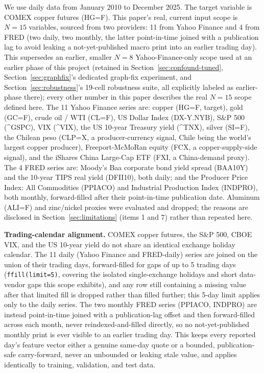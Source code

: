 \documentclass[journal]{IEEEtran}
\begin{document}
We use daily data from January 2010 to December 2025. The target variable is COMEX copper futures (HG=F). This paper's real, current input scope is $N=15$ variables, sourced from two providers: 11 from Yahoo Finance and 4 from FRED (two daily, two monthly, the latter point-in-time joined with a publication lag to avoid leaking a not-yet-published macro print into an earlier trading day). This supersedes an earlier, smaller $N=8$ Yahoo-Finance-only scope used at an earlier phase of this project (retained in Section~\ref{sec:confound-tuned}, Section~\ref{sec:graphfix}'s dedicated graph-fix experiment, and Section~\ref{sec:robustness}'s 19-cell robustness suite, all explicitly labeled as earlier-phase there); every other number in this paper describes the real $N=15$ scope defined here. The 11 Yahoo Finance series are: copper (HG=F, target), gold (GC=F), crude oil / WTI (CL=F), US Dollar Index (DX-Y.NYB), S\&P 500 (\^{}GSPC), VIX (\^{}VIX), the US 10-year Treasury yield (\^{}TNX), silver (SI=F), the Chilean peso (CLP=X, a producer-currency signal, Chile being the world's largest copper producer), Freeport-McMoRan equity (FCX, a copper-supply-side signal), and the iShares China Large-Cap ETF (FXI, a China-demand proxy). The 4 FRED series are: Moody's Baa corporate bond yield spread (BAA10Y) and the 10-year TIPS real yield (DFII10), both daily; and the Producer Price Index: All Commodities (PPIACO) and Industrial Production Index (INDPRO), both monthly, forward-filled after their point-in-time publication date. Aluminum (ALI=F) and zinc/nickel proxies were evaluated and dropped; the reasons are disclosed in Section~\ref{sec:limitations} (items 1 and 7) rather than repeated here.

\textbf{Trading-calendar alignment.} COMEX copper futures, the S\&P 500, CBOE VIX, and the US 10-year yield do not share an identical exchange holiday calendar. The 11 daily (Yahoo Finance and FRED-daily) series are joined on the union of their trading days, forward-filled for gaps of up to 5 trading days (\texttt{ffill(limit=5)}, covering the isolated single-exchange holidays and short data-vendor gaps this scope exhibits), and any row still containing a missing value after that limited fill is dropped rather than filled further; this 5-day limit applies only to the daily series. The two monthly FRED series (PPIACO, INDPRO) are instead point-in-time joined with a publication-lag offset and then forward-filled across each month, never reindexed-and-filled directly, so no not-yet-published monthly print is ever visible to an earlier trading day. This keeps every reported day's feature vector either a genuine same-day quote or a bounded, publication-safe carry-forward, never an unbounded or leaking stale value, and applies identically to training, validation, and test data.
\end{document}
